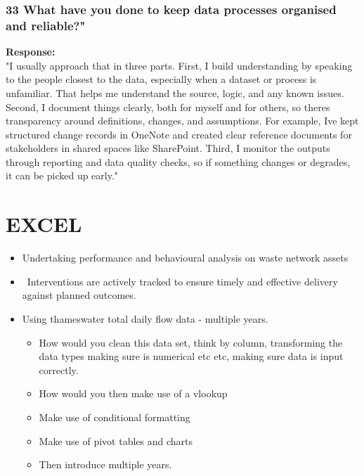 \documentclass[
  letterpaper,
]{scrbook}
\begin{document}
\subsection{\texorpdfstring{\textbf{33 What have you done to keep data
processes organised and
reliable?"}}{33 What have you done to keep data processes organised and reliable?"}}\label{what-have-you-done-to-keep-data-processes-organised-and-reliable}

\textbf{Response:}\\
"I usually approach that in three parts. First, I build understanding by
speaking to the people closest to the data, especially when a dataset or
process is unfamiliar. That helps me understand the source, logic, and
any known issues. Second, I document things clearly, both for myself and
for others, so there\textquotesingle s transparency around definitions,
changes, and assumptions. For example, I\textquotesingle ve kept
structured change records in OneNote and created clear reference
documents for stakeholders in shared spaces like SharePoint. Third, I
monitor the outputs through reporting and data quality checks, so if
something changes or degrades, it can be picked up early."


\chapter{EXCEL}\label{excel-1}

\begin{itemize}
\item
  Undertaking performance and behavioural analysis on waste network
  assets
\item
  ~Interventions are actively tracked to ensure timely and effective
  delivery against planned outcomes.
\item
  Using thameswater total daily flow data - multiple years.

  \begin{itemize}
  \item
    How would you clean this data set, think by column, transforming the
    data types making sure is numerical etc etc, making sure data is
    input correctly.
  \item
    How would you then make use of a vlookup
  \item
    Make use of conditional formatting
  \item
    Make use of pivot tables and charts
  \item
    Then introduce multiple years.
  \end{itemize}
\end{itemize}
\end{document}
